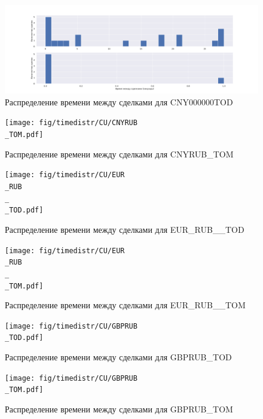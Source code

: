 \begin{appendices}
        \begin{figure}
                \includegraphics[scale=0.35]{fig/timedistr/CU/CNY000000TOD.pdf}
                \caption{Распределение времени между сделками для CNY000000TOD}
                \label{app}
        \end{figure}
        \begin{figure}
            \texttt{[image: fig/timedistr/CU/CNYRUB\\\_TOM.pdf]}
            \caption{Распределение времени между сделками для CNYRUB\_TOM}
            \label{app}
        \end{figure}
        \begin{figure}
                \texttt{[image: fig/timedistr/CU/EUR\\\_RUB\\\_\\\_TOD.pdf]}
                \caption{Распределение времени между сделками для EUR\_RUB\_\_TOD}
                \label{app}
        \end{figure}
        \begin{figure}
            \texttt{[image: fig/timedistr/CU/EUR\\\_RUB\\\_\\\_TOM.pdf]}
            \caption{Распределение времени между сделками для EUR\_RUB\_\_TOM}
            \label{app}
        \end{figure}
        \begin{figure}
                \texttt{[image: fig/timedistr/CU/GBPRUB\\\_TOD.pdf]}
                \caption{Распределение времени между сделками для GBPRUB\_TOD}
                \label{app}
        \end{figure}
        \begin{figure}
                \texttt{[image: fig/timedistr/CU/GBPRUB\\\_TOM.pdf]}
                \caption{Распределение времени между сделками для GBPRUB\_TOM}
                \label{app}
        \end{figure}

\end{appendices}
